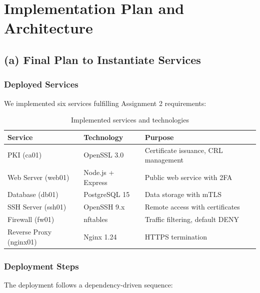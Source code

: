 
\section{Implementation Plan and Architecture}

\subsection{(a) Final Plan to Instantiate Services}

\subsubsection{Deployed Services}

We implemented six services fulfilling Assignment 2 requirements:

\begin{table}[h]
\centering
\begin{tabular}{|l|l|p{6cm}|}
\hline
\textbf{Service} & \textbf{Technology} & \textbf{Purpose} \\
\hline
PKI (ca01) & OpenSSL 3.0 & Certificate issuance, CRL management \\
\hline
Web Server (web01) & Node.js + Express & Public web service with 2FA \\
\hline
Database (db01) & PostgreSQL 15 & Data storage with mTLS \\
\hline
SSH Server (ssh01) & OpenSSH 9.x & Remote access with certificates \\
\hline
Firewall (fw01) & nftables & Traffic filtering, default DENY \\
\hline
Reverse Proxy (nginx01) & Nginx 1.24 & HTTPS termination \\
\hline
\end{tabular}
\caption{Implemented services and technologies}
\end{table}

\subsubsection{Deployment Steps}

The deployment follows a dependency-driven sequence:

